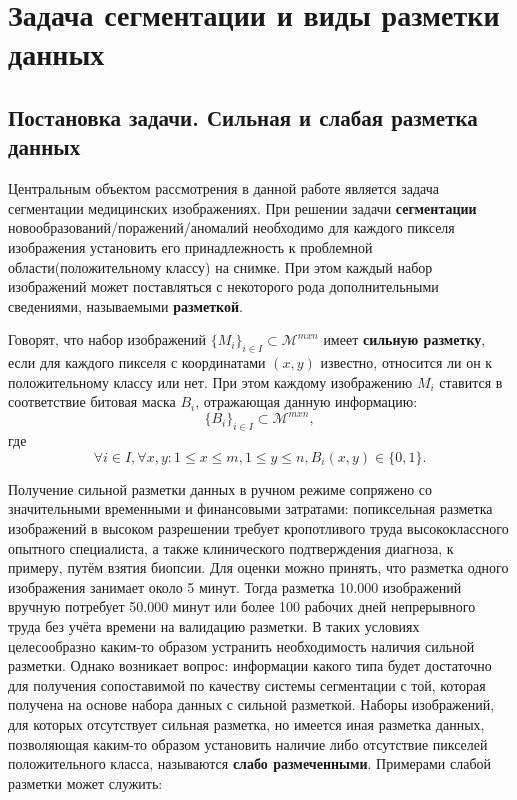 \chapter{Задача сегментации и виды разметки данных} \label{chapt1}


\section{Постановка задачи. Сильная и слабая разметка данных}
Центральным объектом рассмотрения в данной работе является задача сегментации медицинских изображениях.
При решении задачи {\bf сегментации}  новообразований/поражений/аномалий необходимо для каждого пикселя изображения установить его принадлежность к проблемной области(положительному классу) на снимке. При этом каждый набор изображений может поставляться с некоторого рода дополнительными сведениями, называемыми {\bf разметкой}.

Говорят, что набор изображений $\{M_i\}_{i\in I}\subset \mathcal{M}^{mxn}$ имеет {\bf сильную разметку}, если для каждого пикселя с координатами $(x,y)$ известно, относится ли он к положительному классу или нет. При этом каждому изображению $M_i$ ставится в соответствие битовая маска $B_i$, отражающая данную информацию: $$\{B_i\}_{i\in I} \subset \mathcal{M}^{mxn},$$ где $$\forall i \in I,  \forall x,y: 1\le x \le m, 1\le y \le n, B_i(x,y) \in \{0,1\}.$$

Получение сильной разметки данных в ручном режиме сопряжено со значительными временными и финансовыми затратами: попиксельная разметка изображений в высоком разрешении требует кропотливого труда высококлассного опытного специалиста, а также клинического подтверждения диагноза, к примеру, путём взятия биопсии. Для оценки можно принять, что разметка одного изображения занимает около 5 минут. Тогда разметка 10.000 изображений вручную потребует 50.000 минут или более 100 рабочих дней непрерывного труда без учёта времени на валидацию разметки. В таких условиях целесообразно каким-то образом устранить необходимость наличия сильной разметки. Однако возникает вопрос: информации какого типа будет достаточно для получения сопоставимой по качеству системы сегментации с той, которая получена на основе набора данных с сильной разметкой. Наборы изображений, для которых отсутствует сильная разметка, но имеется иная разметка данных, позволяющая каким-то образом установить наличие либо отсутствие пикселей положительного класса, называются {\bf слабо размеченными}. Примерами слабой разметки может служить:

